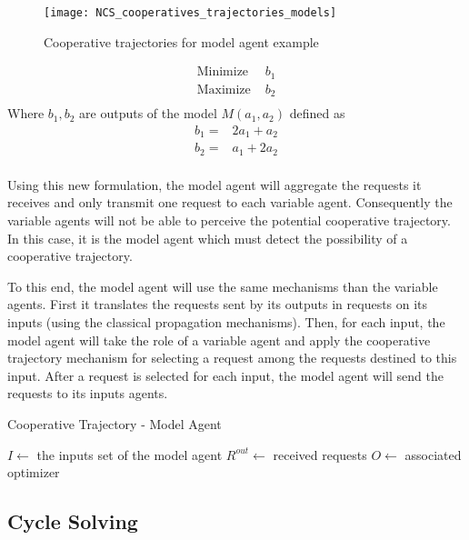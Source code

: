 \begin{figure}
\centering
\texttt{[image: NCS\_cooperatives\_trajectories\_models]}
\caption{Cooperative trajectories for model agent example}\label{NCS_cooperatives_trajectories_models}
\end{figure}

\begin{align*}
\text{Minimize } &b_1\\
\text{Maximize } &b_2\\
\end{align*}
Where $b_1,b_2$ are outputs of the model $M(a_1,a_2)$ defined as
\begin{align*}
b_1 = &2a_1 + a_2\\
b_2 = &a_1 + 2a_2\\
\end{align*}

Using this new formulation, the model agent will aggregate the requests it receives and only transmit one request to each variable agent. Consequently the variable agents will not be able to perceive the potential cooperative trajectory. In this case, it is the model agent which must detect the possibility of a cooperative trajectory.

To this end, the model agent will use the same mechanisms than the variable agents. First it translates the requests sent by its outputs in requests on its inputs (using the classical propagation mechanisms). Then, for each input, the model agent will take the role of a variable agent and apply the cooperative trajectory mechanism for selecting a request among the requests destined to this input. After a request is selected for each input, the model agent will send the requests to its inputs agents.

\begin{algorithm}
\caption{Cooperative Trajectory - Model Agent}
\label{algo_cooperative_trajectory_model}
	$I \leftarrow$ the inputs set of the model agent\;
	$R^{out} \leftarrow$ received requests\;
	$O \leftarrow$ associated optimizer\;
\end{algorithm}

\subsection{Cycle Solving}\label{NCS_cycles}

